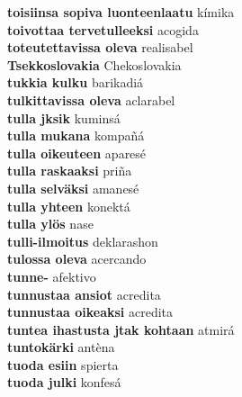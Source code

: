 \textbf{ toisiinsa sopiva luonteenlaatu  } kímika \\
\textbf{ toivottaa tervetulleeksi  } acogida \\
\textbf{ toteutettavissa oleva  } realisabel \\
\textbf{ Tsekkoslovakia  } Chekoslovakia \\
\textbf{ tukkia kulku  } barikadiá \\
\textbf{ tulkittavissa oleva  } aclarabel \\
\textbf{ tulla jksik  } kuminsá \\
\textbf{ tulla mukana  } kompañá \\
\textbf{ tulla oikeuteen  } aparesé \\
\textbf{ tulla raskaaksi  } priña \\
\textbf{ tulla selväksi  } amanesé \\
\textbf{ tulla yhteen  } konektá \\
\textbf{ tulla ylös  } nase \\
\textbf{ tulli-ilmoitus  } deklarashon \\
\textbf{ tulossa oleva  } acercando \\
\textbf{ tunne-  } afektivo \\
\textbf{ tunnustaa ansiot  } acredita \\
\textbf{ tunnustaa oikeaksi  } acredita \\
\textbf{ tuntea ihastusta jtak kohtaan  } atmirá \\
\textbf{ tuntokärki  } antèna \\
\textbf{ tuoda esiin  } spierta \\
\textbf{ tuoda julki  } konfesá \\
